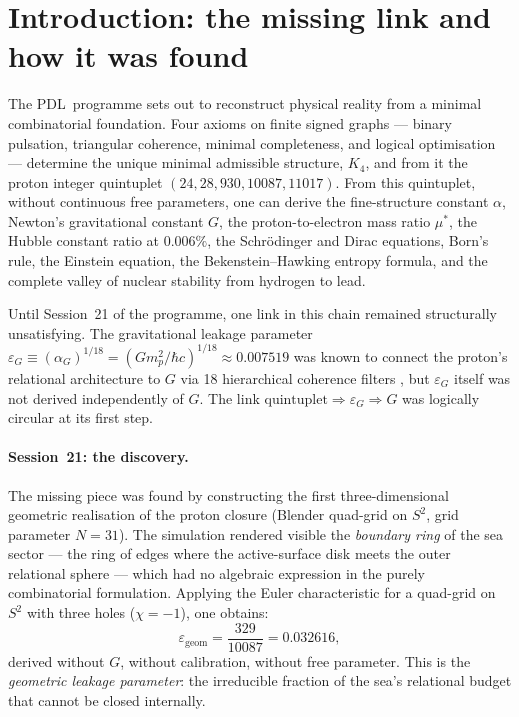 \documentclass[12pt,a4paper]{article}
\theoremstyle{plain}
\theoremstyle{definition}
\theoremstyle{remark}
\newcommand{\PDL}{\textsc{PDL}}
\newcommand{\Kfour}{K_4}
\newcommand{\egeom}{\varepsilon_{\mathrm{geom}}}
\newcommand{\eG}{\varepsilon_G}
\begin{document}
\tableofcontents
\newpage

\section{Introduction: the missing link and how it was found}
\label{sec:intro}

The \PDL\ programme sets out to reconstruct physical reality from a minimal combinatorial foundation. Four axioms on finite signed graphs --- binary pulsation, triangular coherence, minimal completeness, and logical optimisation --- determine the unique minimal admissible structure, $\Kfour$, and from it the proton integer quintuplet $(24,28,930,10087,11017)$. From this quintuplet, without continuous free parameters, one can derive the fine-structure constant $\alpha$, Newton's gravitational constant $G$, the proton-to-electron mass ratio $\mu^*$, the Hubble constant ratio at $0.006\%$, the Schrödinger and Dirac equations, Born's rule, the Einstein equation, the Bekenstein--Hawking entropy formula, and the complete valley of nuclear stability from hydrogen to lead.

Until Session~21 of the programme, one link in this chain remained structurally unsatisfying. The gravitational leakage parameter $\eG \equiv (\alpha_G)^{1/18} = (Gm_p^2/\hbar c)^{1/18} \approx 0.007519$ was known to connect the proton's relational architecture to $G$ via 18 hierarchical coherence filters \citep{D06,D21}, but $\eG$ itself was not derived independently of $G$. The link $\text{quintuplet} \Rightarrow \eG \Rightarrow G$ was logically circular at its first step.

\paragraph{Session~21: the discovery.} The missing piece was found by constructing the first three-dimensional geometric realisation of the proton closure (Blender quad-grid on $S^2$, grid parameter $N=31$). The simulation rendered visible the \emph{boundary ring} of the sea sector --- the ring of edges where the active-surface disk meets the outer relational sphere --- which had no algebraic expression in the purely combinatorial formulation. Applying the Euler characteristic for a quad-grid on $S^2$ with three holes ($\chi=-1$), one obtains:
\[
\egeom = \frac{329}{10087} = 0.032616,
\]
derived without $G$, without calibration, without free parameter. This is the \emph{geometric leakage parameter}: the irreducible fraction of the sea's relational budget that cannot be closed internally.
\end{document}
